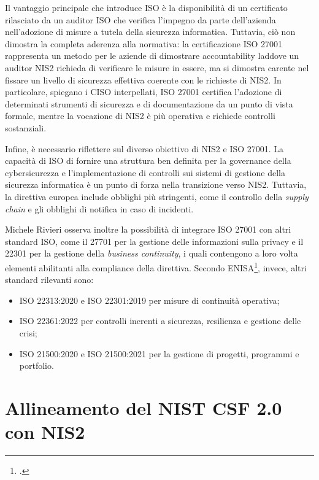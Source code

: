 Il vantaggio principale che introduce ISO è la disponibilità di un certificato rilasciato da un auditor ISO che verifica 
l'impegno da parte dell'azienda nell'adozione di misure a tutela della sicurezza informatica. Tuttavia, ciò non dimostra la completa
aderenza alla normativa: la certificazione ISO 27001 rappresenta un metodo per le aziende di dimostrare accountability laddove un auditor NIS2 
richieda di verificare le misure in essere, ma si dimostra carente nel fissare un livello di sicurezza effettiva coerente con le richieste di NIS2.
In particolare, spiegano i CISO interpellati, ISO 27001 certifica l'adozione di determinati strumenti di sicurezza e di documentazione da un punto 
di vista formale, mentre la vocazione di NIS2 è più operativa e richiede controlli sostanziali. 

Infine, è necessario riflettere sul diverso obiettivo di NIS2 e ISO 27001. La capacità di ISO di fornire una struttura ben definita per la
governance della cybersicurezza e l'implementazione di controlli sui sistemi di gestione della sicurezza informatica è un punto di forza 
nella transizione verso NIS2. Tuttavia, la direttiva europea include obblighi più stringenti, come il controllo della \textit{supply chain}
e gli obblighi di notifica in caso di incidenti. 

Michele Rivieri osserva inoltre la possibilità di integrare ISO 27001
con altri standard ISO, come il 27701 per la gestione delle informazioni sulla privacy e il 22301 per la gestione della
\textit{business continuity}, i quali contengono a loro volta elementi abilitanti alla compliance della direttiva.
Secondo ENISA\footcite{enisa-implementing-guidance}, invece, altri standard rilevanti sono:
\begin{itemize}
    \item ISO 22313:2020 e ISO 22301:2019 per misure di continuità operativa;
    \item ISO 22361:2022 per controlli inerenti a sicurezza, resilienza e gestione delle crisi;
    \item ISO 21500:2020 e ISO 21500:2021 per la gestione di progetti, programmi e portfolio.
\end{itemize}



\section{Allineamento del NIST CSF 2.0 con NIS2}

